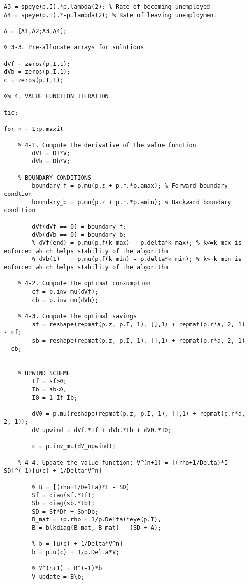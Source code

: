\begin{lstlisting}
A3 = speye(p.I).*p.lambda(2); % Rate of becoming unemployed
A4 = speye(p.I).*-p.lambda(2); % Rate of leaving unemployment

A = [A1,A2;A3,A4];

% 3-3. Pre-allocate arrays for solutions

dVf = zeros(p.I,1);
dVb = zeros(p.I,1);
c = zeros(p.I,1);

%% 4. VALUE FUNCTION ITERATION

tic;

for n = 1:p.maxit

    % 4-1. Compute the derivative of the value function
        dVf = Df*V;
        dVb = Db*V;

    % BOUNDARY CONDITIONS
        boundary_f = p.mu(p.z + p.r.*p.amax); % Forward boundary condtion
        boundary_b = p.mu(p.z + p.r.*p.amin); % Backward boundary condition

        dVf(dVf == 0) = boundary_f;
        dVb(dVb == 0) = boundary_b;
        % dVf(end) = p.mu(p.f(k_max) - p.delta*k_max); % k<=k_max is enforced which helps stability of the algorithm
        % dVb(1)   = p.mu(p.f(k_min) - p.delta*k_min); % k>=k_min is enforced which helps stability of the algorithm

    % 4-2. Compute the optimal consumption
        cf = p.inv_mu(dVf);
        cb = p.inv_mu(dVb);

    % 4-3. Compute the optimal savings
        sf = reshape(repmat(p.z, p.I, 1), [],1) + repmat(p.r*a, 2, 1) - cf;
        sb = reshape(repmat(p.z, p.I, 1), [],1) + repmat(p.r*a, 2, 1) - cb;
      
   
    % UPWIND SCHEME
        If = sf>0;
        Ib = sb<0;
        I0 = 1-If-Ib;

        dV0 = p.mu(reshape(repmat(p.z, p.I, 1), [],1) + repmat(p.r*a, 2, 1));
        dV_upwind = dVf.*If + dVb.*Ib + dV0.*I0;

        c = p.inv_mu(dV_upwind);

    % 4-4. Update the value function: V^(n+1) = [(rho+1/Delta)*I - SD]^(-1)[u(c) + 1/Delta*V^n]
    
        % B = [(rho+1/Delta)*I - SD]
        Sf = diag(sf.*If);
        Sb = diag(sb.*Ib);
        SD = Sf*Df + Sb*Db;
        B_mat = (p.rho + 1/p.Delta)*eye(p.I);
        B = blkdiag(B_mat, B_mat) - (SD + A);

        % b = [u(c) + 1/Delta*V^n]
        b = p.u(c) + 1/p.Delta*V;

        % V^(n+1) = B^(-1)*b
        V_update = B\b;
        

\end{lstlisting}
